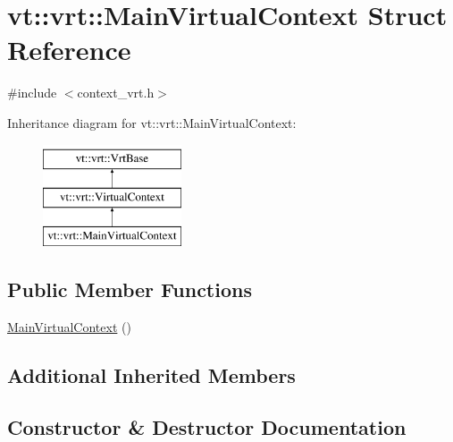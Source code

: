 \hypertarget{structvt_1_1vrt_1_1_main_virtual_context}{}\section{vt\+:\+:vrt\+:\+:Main\+Virtual\+Context Struct Reference}
\label{structvt_1_1vrt_1_1_main_virtual_context}


{\ttfamily \#include $<$context\+\_\+vrt.\+h$>$}

Inheritance diagram for vt\+:\+:vrt\+:\+:Main\+Virtual\+Context\+:\begin{figure}[H]
\begin{center}
\leavevmode
\includegraphics[height=3.000000cm]{structvt_1_1vrt_1_1_main_virtual_context}
\end{center}
\end{figure}
\subsection*{Public Member Functions}
\begin{DoxyCompactItemize}
\item 
\hyperlink{structvt_1_1vrt_1_1_main_virtual_context_ac693b979c55ef3b75a961a6f33e527b6}{Main\+Virtual\+Context} ()
\end{DoxyCompactItemize}
\subsection*{Additional Inherited Members}


\subsection{Constructor \& Destructor Documentation}
\mbox{\label{structvt_1_1vrt_1_1_main_virtual_context_ac693b979c55ef3b75a961a6f33e527b6}} 
